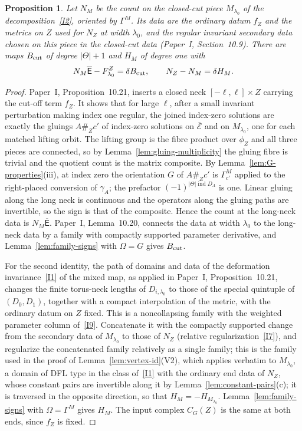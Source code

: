 \documentclass[11pt]{amsart}
\newtheorem{proposition}[theorem]{Proposition}
\theoremstyle{definition}
\theoremstyle{remark}
\theoremstyle{plain}
\numberwithin{equation}{section}
\newcommand{\ind}{\operatorname{ind}}
\begin{document}
\begin{proposition}\label{prop:closed-neck}
Let $N_M$ be the count on the closed-cut piece $M_{\lambda_0}$ of the
decomposition~\ref{I2}, oriented by $\Gamma^M$. Its data are the ordinary
datum $f_Z$ and the metrics on $Z$ used for $N_Z$ at width $\lambda_0$, and
the regular invariant secondary data chosen on this piece in the closed-cut
data (Paper~I, Section~10.9). There are
maps $B_{\rm cut}$ of degree $|\Theta|+1$ and $H_M$ of degree one with
\[
 N_M\overline{\mathsf E}-F^Z_{\lambda_0}=\delta B_{\rm cut},\qquad
 N_Z-N_M=\delta H_M .
\]
\end{proposition}
\begin{proof}
Paper~I, Proposition~10.21, inserts a closed neck $[-\ell,\ell]\times Z$
carrying the cut-off term $f_Z$. It shows that for large $\ell$, after
a small invariant perturbation making index one regular, the joined
index-zero solutions are exactly the gluings $A\#_Zc'$ of index-zero
solutions on $\overline{\mathcal E}$ and on $M_{\lambda_0}$, one for each
matched lifting orbit. The lifting group is the fibre product over $\phi_Z$
and all three pieces are connected, so by
Lemma~\ref{lem:gluing-multiplicity} the gluing fibre is trivial and the
quotient count is the matrix composite. By
Lemma~\ref{lem:G-properties}(iii), at index zero the orientation $G$ of
$A\#_Zc'$ is $\Gamma^M_{c'}$ applied to the right-placed conversion of
$\gamma_A$; the prefactor $(-1)^{|\Theta|\ind D_A}$ is one. Linear gluing along
the long neck is continuous and the operators along the gluing paths
are invertible, so the sign is that of the composite. Hence the count
at the long-neck data is $N_M\overline{\mathsf E}$. Paper~I,
Lemma~10.20, connects the data at width $\lambda_0$ to the long-neck
data by a family with compactly supported parameter derivative, and
Lemma~\ref{lem:family-signs} with $\Omega=G$ gives $B_{\rm cut}$.

For the second identity, the path of domains and data of the deformation invariance~\ref{I1}
of the mixed map, as applied in Paper~I, Proposition~10.21, changes
the finite
torus-neck lengths of
$D_{i,\lambda_0}$ to those of the special quintuple of $(D_0,D_1)$,
together with a compact interpolation of the metric, with the ordinary
datum on $Z$ fixed. This is a noncollapsing family with the weighted
parameter column of~\ref{I9}. Concatenate it with the
compactly supported change from the secondary data of $M_{\lambda_0}$ to
those of $N_Z$ (relative regularization~\ref{I7}), and regularize the concatenated
family relatively as a single family; this is the family used in the proof of Lemma~\ref{lem:vertex-id}(V2), which applies verbatim to $M_{\lambda_0}$, a domain of DFL type in the class of~\ref{I1} with the ordinary end data of $N_Z$, whose constant pairs are invertible along it by Lemma~\ref{lem:constant-pairs}(c); it is traversed in the opposite direction, so that $H_M=-H_{M_{\lambda_0}}$.
Lemma~\ref{lem:family-signs} with $\Omega=\Gamma^M$ gives $H_M$. The input complex $C_G(Z)$ is the
same at both ends, since $f_Z$ is fixed.
\end{proof}
\end{document}
